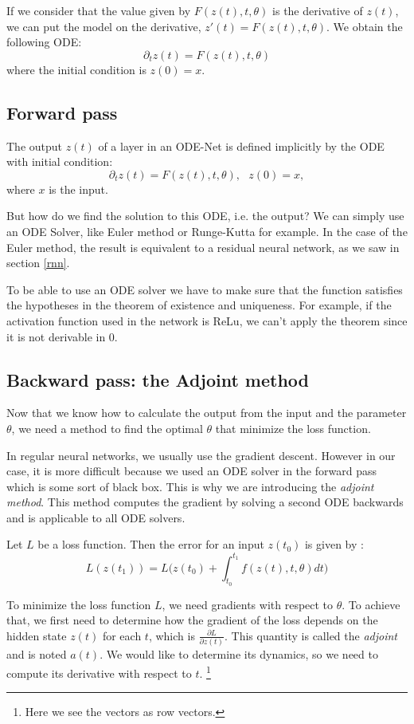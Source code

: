 \documentclass[10pt,a4paper]{article}
\theoremstyle{definition}
\theoremstyle{definition}
\begin{document}
If we consider that the value given by $F(z(t), t, \theta)$ is the derivative of $z(t)$, we can put the model on the derivative, $z'(t) = F(z(t), t, \theta)$.  We obtain the following ODE:
$$ \partial_t z(t) = F(z(t), t, \theta) $$
where the initial condition is $z(0) = x$. 

\subsection{Forward pass}

The output $z(t)$ of a layer in an ODE-Net is defined implicitly by the ODE with initial condition:
$$ \partial_t z(t) = F(z(t), t, \theta), \ \ \ z(0) = x, $$
where $x$ is the input.

But how do we find the solution to this ODE, i.e. the output? We can simply use an ODE Solver, like Euler method or Runge-Kutta for example. In the case of the Euler method, the result is equivalent to a residual neural network, as we saw in section \ref{rnn}.

To be able to use an ODE solver we have to make sure that the function satisfies the hypotheses in the theorem of existence and uniqueness. For example, if the activation function used in the network is ReLu, we can't apply the theorem since it is not derivable in $0$.

\subsection{Backward pass: the Adjoint method}
Now that we know how to calculate the output from the input and the parameter $\theta$, we need a method to find the optimal $\theta$ that minimize the loss function.

In regular neural networks, we usually use the gradient descent. However in our case, it is more difficult because we used an ODE solver in the forward pass which is some sort of black box. This is why we are introducing the \textit{adjoint method}. This method computes the gradient by solving a second ODE backwards and is applicable to all ODE solvers.

Let $L$ be a loss function. Then the error for an input $z(t_0)$ is given by :
$$
L(z(t_1)) = L \big( z(t_0) + \int_{t_0}^{t_1} f(z(t),t,\theta) dt \big)
$$

To minimize the loss function $L$, we need gradients with respect to $\theta$. To achieve that, we first need to determine how the gradient of the loss depends on the hidden state $z(t)$ for each $t$, which is $\frac{\partial L}{\partial z(t)}$. This quantity is called the \textit{adjoint} and is noted $a(t)$. We would like to determine its dynamics, so we need to compute its derivative with respect to $t$. \footnote{Here we see the vectors as row vectors.}
\end{document}
